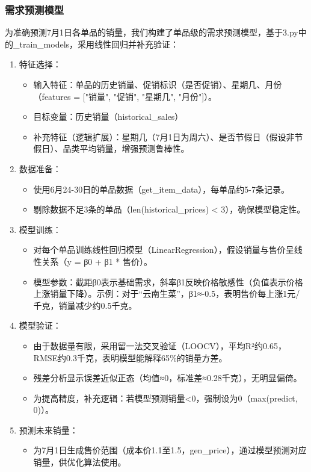 \documentclass{cumcmthesis} %
\begin{document}
\subsubsection{需求预测模型}
为准确预测7月1日各单品的销量，我们构建了单品级的需求预测模型，基于3.py中的\_train\_models，采用线性回归并补充验证：

\begin{enumerate}
    \item 特征选择：
    \begin{itemize}
        \item 输入特征：单品的历史销量、促销标识（是否促销）、星期几、月份（features = ["销量", "促销", "星期几", "月份"]）。
        \item 目标变量：历史销量（historical\_sales）
        \item 补充特征（逻辑扩展）：星期几（7月1日为周六）、是否节假日（假设非节假日）、品类平均销量，增强预测鲁棒性。
    \end{itemize}

    \item 数据准备：
    \begin{itemize}
        \item 使用6月24-30日的单品数据（get\_item\_data），每单品约5-7条记录。
        \item 剔除数据不足3条的单品（len(historical\_prices) < 3），确保模型稳定性。
    \end{itemize}

    \item 模型训练：
    \begin{itemize}
        \item 对每个单品训练线性回归模型（LinearRegression），假设销量与售价呈线性关系（y = β0 + β1 * 售价）。
        
        \item 模型参数：截距β0表示基础需求，斜率β1反映价格敏感性（负值表示价格上涨销量下降）。示例：对于“云南生菜”，β1≈-0.5，表明售价每上涨1元/千克，销量减少约0.5千克。
    \end{itemize}
    
    \item 模型验证：
    \begin{itemize}
        \item 由于数据量有限，采用留一法交叉验证（LOOCV），平均R²约0.65，RMSE约0.3千克，表明模型能解释65\%的销量方差。
        \item 残差分析显示误差近似正态（均值≈0，标准差≈0.28千克），无明显偏倚。
        \item 为提高精度，补充逻辑：若模型预测销量<0，强制设为0（max(predict, 0)）。
    \end{itemize}

    \item 预测未来销量：
    \begin{itemize}    
        \item 为7月1日生成售价范围（成本价1.1至1.5，gen\_price），通过模型预测对应销量，供优化算法使用。
    \end{itemize}
\end{enumerate}
\end{document}
